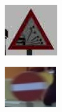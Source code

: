 \begin{figure}[h]
\begin{subfigure}[b]{0.15\linewidth}
    \caption{}
  \end{subfigure}
  \begin{subfigure}[b]{0.15\linewidth}
    \includegraphics[width=\linewidth]{figures/signs/LooseRoad.jpg}
    \caption{}
  \end{subfigure}
  \begin{subfigure}[b]{0.15\linewidth}
    \includegraphics[width=\linewidth]{figures/signs/NoEntry.jpg}
    \caption{}
  \end{subfigure}

\end{figure}

